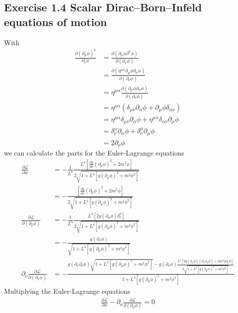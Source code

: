 \documentclass[../main.tex]{subfiles}
\begin{document}
\subsection{Exercise 1.4 Scalar Dirac–Born–Infeld equations of motion}
With
\begin{align}
\frac{\partial(\partial_\mu\phi)^2}{\partial_\nu\phi}
&=\frac{\partial(\partial_\mu\phi\partial^\mu\phi)}{\partial(\partial_\nu\phi)}\\
&=\frac{\partial(\eta^{\mu\alpha}\partial_\mu\phi\partial_\alpha\phi)}{\partial(\partial_\nu\phi)}\\
&=\eta^{\mu\alpha}\frac{\partial(\partial_\mu\phi\partial_\alpha\phi)}{\partial(\partial_\nu\phi)}\\
&=\eta^{\mu\alpha}(\delta_{\mu\nu}\partial_\alpha\phi+\partial_\mu\phi\delta_{\alpha\nu})\\
&=\eta^{\mu\alpha}\delta_{\mu\nu}\partial_\alpha\phi+\eta^{\mu\alpha}\delta_{\alpha\nu}\partial_\mu\phi\\
&=\delta_\nu^\alpha\partial_\alpha\phi+\delta_\nu^\mu\partial_\mu\phi\\
&=2\partial_\nu\phi
\end{align}
we can calculate the parts for the Euler-Lagrange equations
\begin{align}
\frac{\partial\mathcal{L}}{\partial\phi}
&=-\frac{1}{L^4}\frac{L^4\left[\frac{\partial g}{\partial\phi}(\partial_\mu\phi)^2+2m^2\phi\right]}{2\sqrt{1+L^4[g(\partial_\mu\phi)^2+m^2\phi^2]}}\\
&=-\frac{\left[\frac{\partial g}{\partial\phi}(\partial_\mu\phi)^2+2m^2\phi\right]}{2\sqrt{1+L^4[g(\partial_\mu\phi)^2+m^2\phi^2]}}\\
%
\frac{\partial\mathcal{L}}{\partial(\partial_\nu\phi)}
&=-\frac{1}{L^4}\frac{L^4\left[2g(\partial_\mu\phi)\delta^\mu_\nu\right]}{2\sqrt{1+L^4[g(\partial_\mu\phi)^2+m^2\phi^2]}}\\
&=-\frac{g(\partial_\nu\phi)}{\sqrt{1+L^4[g(\partial_\mu\phi)^2+m^2\phi^2]}}\\
%
\partial_\nu\frac{\partial\mathcal{L}}{\partial(\partial_\nu\phi)}&=-\frac{g(\partial_\nu\partial_\nu\phi)\sqrt{1+L^4[g(\partial_\mu\phi)^2+m^2\phi^2]}-g(\partial_\nu\phi)\frac{L^4[2g(\partial_\mu\phi)(\partial_\nu\partial_\mu\phi)+2m^2\phi\partial_\nu\phi]}{2\sqrt{1+L^4[g(\partial_\mu\phi)^2+m^2\phi^2]}}}{1+L^4[g(\partial_\mu\phi)^2+m^2\phi^2]}
\end{align}
Multiplying the Euler-Lagrange equations 
\begin{align}
\frac{\partial\mathcal{L}}{\partial\phi}-\partial_\nu\frac{\partial\mathcal{L}}{\partial(\partial_\nu\phi)}=0
\end{align}
\end{document}
